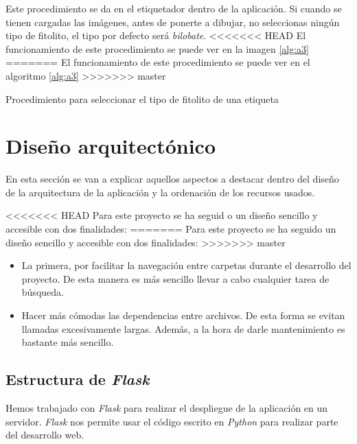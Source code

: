 Este procedimiento se da en el etiquetador dentro de la aplicación.
Si cuando se tienen cargadas las imágenes, antes de ponerte a dibujar, no seleccionas ningún tipo de fitolito, el tipo por defecto será \textit{bilobate}.
<<<<<<< HEAD
El funcionamiento de este procedimiento se puede ver en la imagen \ref{alg:a3}
=======
El funcionamiento de este procedimiento se puede ver en el algoritmo \ref{alg:a3}
>>>>>>> master

\begin{algorithm}

		{
		}
		
	\caption{Procedimiento para seleccionar el tipo de fitolito de una etiqueta}
	\label{alg:a3}
\end{algorithm}
\section{Diseño arquitectónico}

En esta sección se van a explicar aquellos aspectos a destacar dentro del diseño de la arquitectura de la aplicación y la ordenación de los recursos usados.

<<<<<<< HEAD
Para este proyecto se ha seguid
o un diseño sencillo y accesible con dos finalidades:
=======
Para este proyecto se ha seguido un diseño sencillo y accesible con dos finalidades:
>>>>>>> master

\begin{itemize}
	\item La primera, por facilitar la navegación entre carpetas durante el desarrollo del proyecto. De esta manera es más sencillo llevar a cabo cualquier tarea de búsqueda.
	
	\item Hacer más cómodas las dependencias entre archivos. De esta forma se evitan llamadas excesivamente largas. Además, a la hora de darle mantenimiento es bastante más sencillo.
\end{itemize}

\subsection{Estructura de \textit{Flask}}

Hemos trabajado con \textit{Flask} para realizar el despliegue de la aplicación en un servidor. \textit{Flask} nos permite usar el código escrito en \textit{Python} para realizar parte del desarrollo web.

